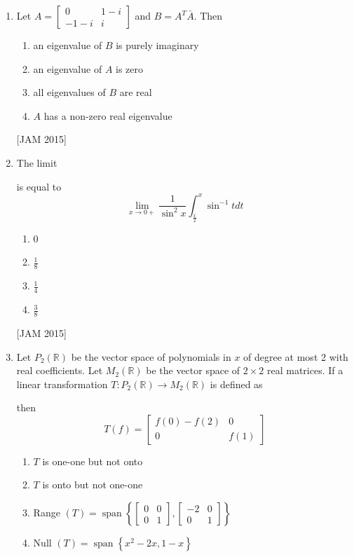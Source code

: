 \begin{enumerate}
\item 

Let $A=\left[\begin{array}{cc}0 & 1-i \\ -1-i & i\end{array}\right]$ and $B=A^{T} \bar{A}$. Then 
\begin{enumerate}
    \item an eigenvalue of $B$ is purely imaginary 
\item an eigenvalue of $A$ is zero 
\item all eigenvalues of $B$ are real 
\item $A$ has a non-zero real eigenvalue
\end{enumerate}
\hfill [JAM 2015]





\item  The limit

is equal to
$$
\lim _{x \rightarrow 0+} \frac{1}{\sin ^{2} x} \int_{\frac{x}{2}}^{x} \sin ^{-1} t d t
$$
\begin{enumerate}
    \item 0 
\item $\frac{1}{8}$ 
\item $\frac{1}{4}$ 
\item $\frac{3}{8}$
\end{enumerate}
\hfill [JAM 2015]





\item  Let $P_{2}(\mathbb{R})$ be the vector space of polynomials in $x$ of degree at most 2 with real coefficients. Let $M_{2}(\mathbb{R})$ be the vector space of $2 \times 2$ real matrices. If a linear transformation $T: P_{2}(\mathbb{R}) \rightarrow M_{2}(\mathbb{R})$ is defined as

then
$$
T(f)=\left[\begin{array}{cc}
f(0)-f(2) & 0 \\
0 & f(1)
\end{array}\right]
$$

\begin{enumerate}
    \item $T$ is one-one but not onto 
\item $T$ is onto but not one-one 
\item Range $(T)=\operatorname{span}\left\{\left[\begin{array}{ll}0 & 0 \\ 0 & 1\end{array}\right],\left[\begin{array}{cc}-2 & 0 \\ 0 & 1\end{array}\right]\right\}$ 
\item Null $(T)=\operatorname{span}\left\{x^{2}-2 x, 1-x\right\}$ 


\end{enumerate}
\end{enumerate}
